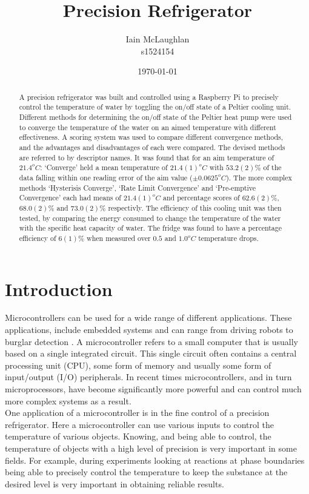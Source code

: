 \documentclass[10pt]{article}
\title{Precision Refrigerator}
\author{Iain McLaughlan\\ s1524154 }
\date{\today}
\begin{document}
\maketitle
\begin{abstract}
A precision refrigerator was built and controlled using a Raspberry Pi to precisely control the temperature of water by toggling the on/off state of a Peltier \cite{peltier}\cite{pelt} cooling unit. Different methods for determining the on/off state of the Peltier heat pump were used to converge the temperature of the water on an aimed temperature with different effectiveness. A scoring system was used to compare different convergence methods, and the advantages and disadvantages of each were compared. The devised methods are referred to by descriptor names. It was found that for an aim temperature of $21.4^oC$: `Converge' held a mean temperature of $21.4(1)^oC$ with $53.2(2)\%$ of the data falling within one reading error of the aim value ($\pm 0.0625^oC$). The more complex methods `Hysterisis Converge', `Rate Limit Convergence' and `Pre-emptive Convergence' each had means of $21.4(1)^oC$ and percentage scores of $62.6(2)\%$, $68.0(2)\%$ and $73.0(2)\%$ respectivly. The efficiency of this cooling unit was then tested, by comparing the energy consumed to change the temperature of the water with the specific heat capacity of water. The fridge was found to have a percentage efficiency of $6(1)\%$ when measured over $0.5$ and $1.0^oC$ temperature drops.
\end{abstract}

\section*{Introduction}
Microcontrollers can be used for a wide range of different applications. These applications, include embedded systems and can range from driving robots \cite{robomicro} to burglar detection \cite{microburg}. A microcontroller refers to a small computer that is usually based on a single integrated circuit. This single circuit often contains a central processing unit (CPU), some form of memory and usually some form of input/output (I/O) peripherals. In recent times microcontrollers, and in turn microprocessors, have become significantly more powerful and can control much more complex systems as a result.\\

One application of a microcontroller is in the fine control of a precision refrigerator. Here a microcontroller can use various inputs to control the temperature of various objects. Knowing, and being able to control, the temperature of objects with a high level of precision is very important in some fields. For example, during experiments looking at reactions at phase boundaries \cite{microfluidic} being able to precisely control the temperature to keep the substance at the desired level is very important in obtaining reliable results.\\
\end{document}
